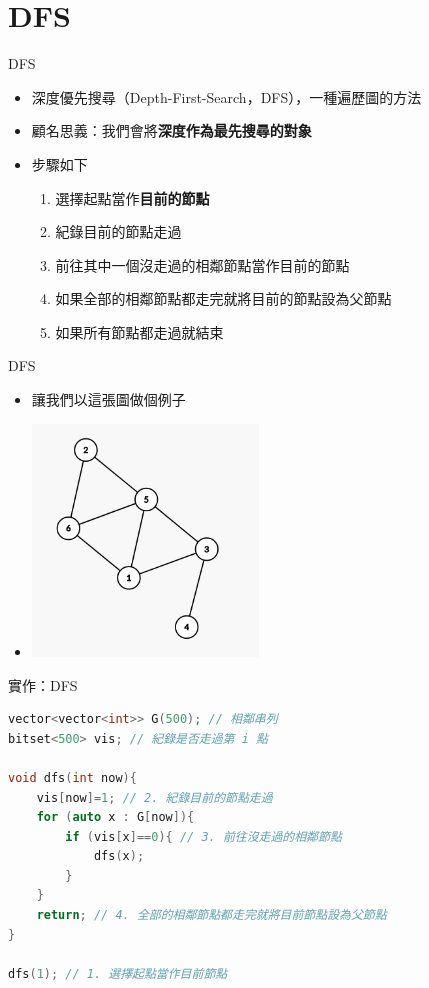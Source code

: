 \documentclass[mathserif]{beamer}
\begin{document}
\section{DFS}

\begin{frame}{DFS}
    \begin{itemize}
        \item 深度優先搜尋（Depth-First-Search，DFS），一種遍歷圖的方法
        \item 顧名思義：我們會將\textbf{深度作為最先搜尋的對象}
        \item 步驟如下
            \begin{enumerate}
                \itemsep=5pt
                \item 選擇起點當作\textbf{目前的節點}
                \item 紀錄目前的節點走過
                \item 前往其中一個沒走過的相鄰節點當作目前的節點
                \item 如果全部的相鄰節點都走完就將目前的節點設為父節點
                \item 如果所有節點都走過就結束
            \end{enumerate}
    \end{itemize}
\end{frame}

\begin{frame}{DFS}
    \begin{itemize}
        \item 讓我們以這張圖做個例子
        \item \includegraphics[width=6.0cm]{img/graph-5.png}
    \end{itemize}
\end{frame}

\begin{frame}[fragile]{實作：DFS}
\begin{lstlisting}[language=C++, caption={}]
vector<vector<int>> G(500); // 相鄰串列
bitset<500> vis; // 紀錄是否走過第 i 點

void dfs(int now){
    vis[now]=1; // 2. 紀錄目前的節點走過
    for (auto x : G[now]){
        if (vis[x]==0){ // 3. 前往沒走過的相鄰節點
            dfs(x);
        }
    }
    return; // 4. 全部的相鄰節點都走完就將目前節點設為父節點
}

dfs(1); // 1. 選擇起點當作目前節點
\end{lstlisting}
\end{frame}
\end{document}
